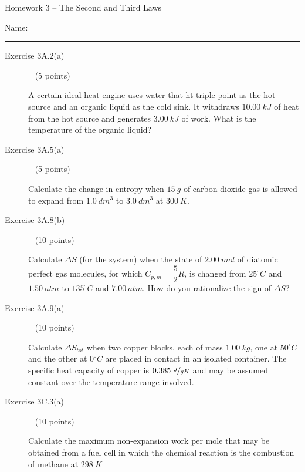 \documentclass[12pt, openany, letterpaper]{memoir}
\begin{document}
\begin{center}
	{\large Homework 3 -- The Second and Third Laws}
\end{center}

Name: \rule[-.1mm]{15em}{0.1pt}

\begin{description}
	\item [Exercise 3A.2(a)] ~ (5 points)

	      A certain ideal heat engine uses water that ht triple point as the hot source and an organic liquid as the cold sink. It withdraws $10.00~kJ$ of heat from the hot source and generates $3.00~kJ$ of work. What is the temperature of the organic liquid?

	      \vspace{15em}
	\item [Exercise 3A.5(a)] ~ (5 points)

	      Calculate the change in entropy when $15~g$ of carbon dioxide gas is allowed to expand from $1.0~dm^3$ to $3.0~dm^3$ at $300~K$.

	      \vspace{15em}\newpage
	\item [Exercise 3A.8(b)] ~ (10 points)

	      Calculate $\Delta S$ (for the system) when the state of $2.00~mol$ of diatomic perfect gas molecules, for which $C_{p,m}=\dfrac{5}{2}R$, is changed from $25^\circ C$ and $1.50~atm$ to $135^\circ C$ and $7.00~atm$. How do you rationalize the sign of $\Delta S$?

	      \vspace{21em}

	\item [Exercise 3A.9(a)] ~ (10 points)

	      Calculate $\Delta S_{tot}$ when two copper blocks, each of mass $1.00~kg$, one at $50^\circ C$ and the other at $0^\circ C$ are placed in contact in an isolated container. The specific heat capacity of copper is $0.385~\nicefrac{J}{gK}$ and may be assumed constant over the temperature range involved.

	      \vspace{21em}

	\item [Exercise 3C.3(a)] ~ (10 points)

	      Calculate the maximum non-expansion work per mole that may be obtained from a fuel cell in which the chemical reaction is the combustion of methane at $298~K$


\end{description}
\end{document}
